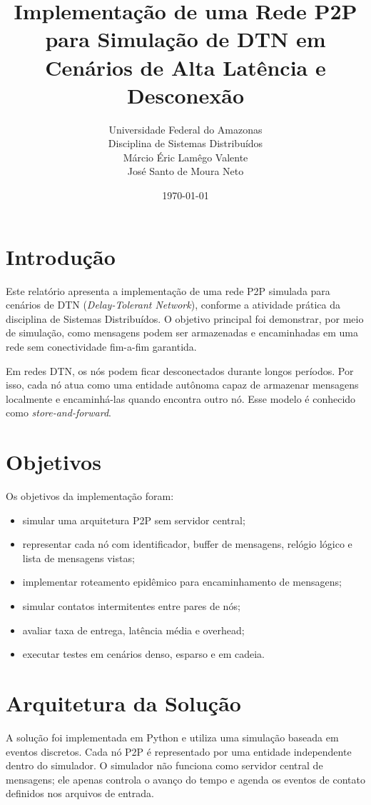 \documentclass[12pt,a4paper]{article}
\title{
  \textbf{Implementação de uma Rede P2P para Simulação de DTN em Cenários de Alta Latência e Desconexão}
}
\author{
  Universidade Federal do Amazonas\\
  Disciplina de Sistemas Distribuídos\\[0.5cm]
  Márcio Éric Lamêgo Valente\\
  José Santo de Moura Neto
}
\date{\today}
\begin{document}
\maketitle
\thispagestyle{empty}

\newpage
\tableofcontents
\newpage

\section{Introdução}

Este relatório apresenta a implementação de uma rede P2P simulada para cenários de DTN
(\textit{Delay-Tolerant Network}), conforme a atividade prática da disciplina de Sistemas
Distribuídos. O objetivo principal foi demonstrar, por meio de simulação, como mensagens
podem ser armazenadas e encaminhadas em uma rede sem conectividade fim-a-fim garantida.

Em redes DTN, os nós podem ficar desconectados durante longos períodos. Por isso, cada nó
atua como uma entidade autônoma capaz de armazenar mensagens localmente e encaminhá-las
quando encontra outro nó. Esse modelo é conhecido como \textit{store-and-forward}.

\section{Objetivos}

Os objetivos da implementação foram:

\begin{itemize}
  \item simular uma arquitetura P2P sem servidor central;
  \item representar cada nó com identificador, buffer de mensagens, relógio lógico e lista de mensagens vistas;
  \item implementar roteamento epidêmico para encaminhamento de mensagens;
  \item simular contatos intermitentes entre pares de nós;
  \item avaliar taxa de entrega, latência média e overhead;
  \item executar testes em cenários denso, esparso e em cadeia.
\end{itemize}

\section{Arquitetura da Solução}

A solução foi implementada em Python e utiliza uma simulação baseada em eventos discretos.
Cada nó P2P é representado por uma entidade independente dentro do simulador. O simulador
não funciona como servidor central de mensagens; ele apenas controla o avanço do tempo e
agenda os eventos de contato definidos nos arquivos de entrada.
\end{document}
